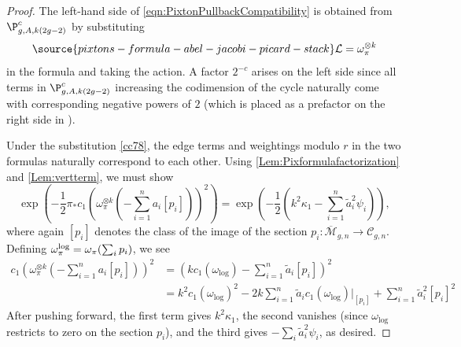 \begin{proof}
The left-hand side of \eqref{eqn:PixtonPullbackCompatibility} is obtained from $\P_{g,A,k(2g-2)}^c$ by substituting
\begin{equation}\label{cc78}
\source{pixtons-formula-abel-jacobi-picard-stack}
    \mathcal{L} = \omega_\pi^{\otimes k}
    \end{equation}
in
the formula and taking the action.
A factor $2^{-c}$ arises on the left side
since all terms in $\P_{g,A,k(2g-2)}^c$ increasing the codimension of the cycle naturally come with corresponding negative powers of $2$ (which is placed as
a prefactor on the right side in \cite[Section 1.1]{Janda2016Double-ramifica}).

Under the substitution \eqref{cc78},
the edge terms and weightings modulo $r$ in the two formulas
naturally correspond to each other.
Using \cref{Lem:Pixformulafactorization} and \cref{Lem:vertterm}, we must
show
\[\exp \left(-\frac{1}{2} \pi_* c_1(\omega_\pi^{\otimes k}(- \sum_{i=1}^n a_i [p_i]) )^2 \right) = \exp \left(-\frac{1}{2} \left( k^2 \kappa_1 -  \sum_{i=1}^n \tilde a_i^2 \psi_i \right)\right),\]
where again $[p_i]$ denotes the class of the image of the section $p_i: \overline{\mathcal{M}}_{g,n} \to \mathcal{C}_{g,n}$. Defining $\omega_\pi^\textup{log} = \omega_\pi(\sum_i p_i)$, we see
\begin{align*}
c_1(\omega_\pi^{\otimes k}(- \sum_{i=1}^n a_i [p_i]) )^2
& = ( k c_1(\omega_{\log}) - \sum_{i=1}^n \tilde a_i [p_i] ) ^2 \\
& = k^2 c_1(\omega_{\log})^2 - 2 k \sum_{i=1}^n \tilde a_i c_1(\omega_{\log})|_{[p_i]} + \sum_{i=1}^n \tilde a_i^2 [p_i]^2
\end{align*}
After pushing forward, the first term gives $k^2 \kappa_1$, the second vanishes (since $\omega_{\log}$ restricts to zero on the section $p_i$), and the third gives $- \sum_i \tilde a_i^2 \psi_i$, as desired.
\end{proof}




